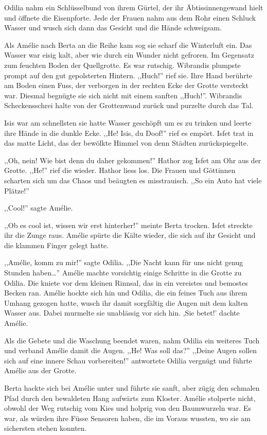 \documentclass[11pt,titlepage,a5paper]{book}
\newcommand{\am}{Amélie }
\begin{document}
Odilia nahm ein Schlüsselbund von ihrem Gürtel, der ihr Äbtissinnengewand hielt und öffnete die Eisenpforte. Jede der Frauen nahm aus dem Rohr einen Schluck Wasser und wusch sich dann das Gesicht und die Hände schweigsam.

Als \am nach Berta an die Reihe kam sog sie scharf die Winterluft ein. Das Wasser war eisig kalt, aber wie durch ein Wunder nicht gefroren. Im Gegensatz zum feuchten Boden der Quellgrotte. Es war rutschig. Wibrandis plumpste prompt auf den gut gepolsterten Hintern. ,,Huch!'' rief sie. Ihre Hand berührte am Boden einen Fuss, der verborgen in der rechten Ecke der Grotte versteckt war. Diesmal begnügte sie sich nicht mit einem sanften ,,Huch!''. Wibrandis Scheckensschrei halte von der Grottenwand zurück und purzelte durch das Tal.

Isis war am schnellsten sie hatte Wasser geschöpft um es zu trinken und leerte ihre Hände in die dunkle Ecke. ,,He! Isis, du Doof!'' rief es empört. Isfet trat in das matte Licht, das der bewölkte Himmel von denn Städten zurückspiegelte.

,,Oh, nein! Wie bist denn du daher gekommen!'' Hathor zog Isfet am Ohr aus der Grotte. ,,He!'' rief die wieder. Hathor liess los. Die Frauen und Göttinnen scharten sich um das Chaos und beäugten es misstrauisch. ,,So ein Auto hat viele Plätze!''

,,Cool!'' sagte Amélie.

,,Ob es cool ist, wissen wir erst hinterher!'' meinte Berta trocken. Isfet streckte ihr die Zunge raus. Amélie spürte die Kälte wieder, die sich auf ihr Gesicht und die klammen Finger gelegt hatte.

,,Amélie, komm zu mir!'' sagte Odilia. ,,Die Nacht kann für uns nicht genug Stunden haben\dots '' Amélie machte vorsichtig einige Schritte in die Grotte zu Odilia. Die kniete vor dem kleinen Rinnsal, das in ein vereistes und bemostes Becken ran. Amélie hockte sich hin und Odilia, die ein feines Tuch aus ihrem Umhang gezogen hatte, wusch ihr damit sorgfältig die Augen mit dem kalten Wasser aus. Dabei murmelte sie unablässig vor sich hin. ,Sie betet!' dachte Amélie.

Als die Gebete und die Waschung beendet waren, nahm Odilia ein weiteres Tuch und verband Amélie damit die Augen. ,,He! Was soll das?'' ,,Deine Augen sollen sich auf eine innere Schau vorbereiten!'' antwortete Odilia vergnügt und führte Amélie aus der Grotte.

Berta hackte sich bei Amélie unter und führte sie sanft, aber zügig den schmalen Pfad durch den bewaldeten Hang aufwärts zum Kloster. Amélie stolperte nicht, obwohl der Weg rutschig vom Kies und holprig von den Baumwurzeln war. Es war, als würden ihre Füsse Sensoren haben, die im Voraus wussten, wo sie am sichersten stehen konnten.
\end{document}
